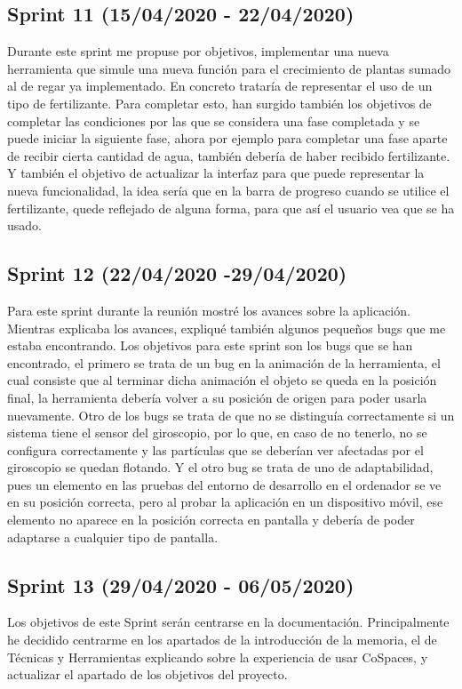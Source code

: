 \subsection{Sprint 11 (15/04/2020 - 22/04/2020)}
Durante este sprint me propuse por objetivos, implementar una nueva herramienta que simule una nueva función para el crecimiento de plantas sumado al de regar ya implementado. En concreto trataría de representar el uso de un tipo de fertilizante. Para completar esto, han surgido también los objetivos de completar las condiciones por las que se considera una fase completada y se puede iniciar la siguiente fase, ahora por ejemplo para completar una fase aparte de recibir cierta cantidad de agua, también debería de haber recibido fertilizante. Y también el objetivo de actualizar la interfaz para que puede representar la nueva funcionalidad, la idea sería que en la barra de progreso cuando se utilice el fertilizante, quede reflejado de alguna forma, para que así el usuario vea que se ha usado.
\subsection{Sprint 12 (22/04/2020 -29/04/2020)}
Para este sprint durante la reunión mostré los avances sobre la aplicación. Mientras explicaba los avances, expliqué también algunos pequeños bugs que me estaba encontrando.
Los objetivos para este sprint son los bugs que se han encontrado, el primero se trata de un bug en la animación de la herramienta, el cual consiste que al terminar dicha animación el objeto se queda en la posición final, la herramienta debería volver a su posición de origen para poder usarla nuevamente. Otro de los bugs se trata de que no se distinguía correctamente si un sistema tiene el sensor del giroscopio, por lo que, en caso de no tenerlo, no se configura correctamente y las partículas que se deberían ver afectadas por el giroscopio se quedan flotando. Y el otro bug se trata de uno de adaptabilidad, pues un elemento en las pruebas del entorno de desarrollo en el ordenador se ve en su posición correcta, pero al probar la aplicación en un dispositivo móvil, ese elemento no aparece en la posición correcta en pantalla y debería de poder adaptarse a cualquier tipo de pantalla. 

\subsection{Sprint 13 (29/04/2020 - 06/05/2020)}
Los objetivos de este Sprint serán centrarse en la documentación. Principalmente he decidido centrarme en los apartados de la introducción de la memoria, el de Técnicas y Herramientas explicando sobre la experiencia de usar CoSpaces, y actualizar el apartado de los objetivos del proyecto.

